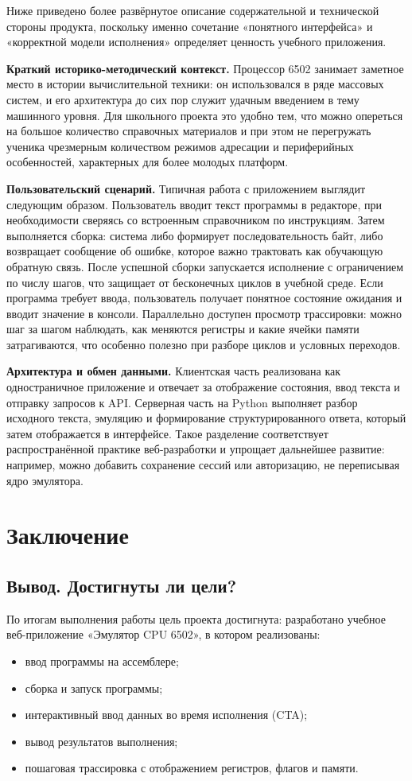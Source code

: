\documentclass[12pt,a4paper]{article}
\begin{document}
Ниже приведено более развёрнутое описание содержательной и технической стороны продукта, поскольку именно сочетание «понятного интерфейса» и «корректной модели исполнения» определяет ценность учебного приложения.

\textbf{Краткий историко-методический контекст.} Процессор 6502 занимает заметное место в истории вычислительной техники: он использовался в ряде массовых систем, и его архитектура до сих пор служит удачным введением в тему машинного уровня. Для школьного проекта это удобно тем, что можно опереться на большое количество справочных материалов и при этом не перегружать ученика чрезмерным количеством режимов адресации и периферийных особенностей, характерных для более молодых платформ.

\textbf{Пользовательский сценарий.} Типичная работа с приложением выглядит следующим образом. Пользователь вводит текст программы в редакторе, при необходимости сверяясь со встроенным справочником по инструкциям. Затем выполняется сборка: система либо формирует последовательность байт, либо возвращает сообщение об ошибке, которое важно трактовать как обучающую обратную связь. После успешной сборки запускается исполнение с ограничением по числу шагов, что защищает от бесконечных циклов в учебной среде. Если программа требует ввода, пользователь получает понятное состояние ожидания и вводит значение в консоли. Параллельно доступен просмотр трассировки: можно шаг за шагом наблюдать, как меняются регистры и какие ячейки памяти затрагиваются, что особенно полезно при разборе циклов и условных переходов.

\textbf{Архитектура и обмен данными.} Клиентская часть реализована как одностраничное приложение и отвечает за отображение состояния, ввод текста и отправку запросов к API. Серверная часть на Python выполняет разбор исходного текста, эмуляцию и формирование структурированного ответа, который затем отображается в интерфейсе. Такое разделение соответствует распространённой практике веб-разработки и упрощает дальнейшее развитие: например, можно добавить сохранение сессий или авторизацию, не переписывая ядро эмулятора.

\section{Заключение}
\subsection{Вывод. Достигнуты ли цели?}
По итогам выполнения работы цель проекта достигнута: разработано учебное веб-приложение «Эмулятор CPU 6502», в котором реализованы:
\begin{itemize}
  \item ввод программы на ассемблере;
  \item сборка и запуск программы;
  \item интерактивный ввод данных во время исполнения (CTA);
  \item вывод результатов выполнения;
  \item пошаговая трассировка с отображением регистров, флагов и памяти.
\end{itemize}
\end{document}
